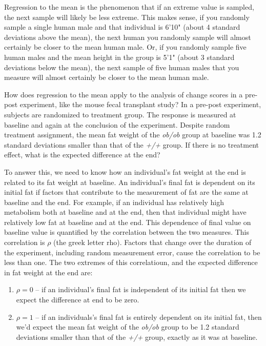 \documentclass[]{book}
\providecommand{\tightlist}{%
  \setlength{\itemsep}{0pt}\setlength{\parskip}{0pt}}
\begin{document}
Regression to the mean is the phenomenon that if an extreme value is
sampled, the next sample will likely be less extreme. This makes sense,
if you randomly sample a single human male and that individual is 6'10"
(about 4 standard deviations above the mean), the next human you
randomly sample will almost certainly be closer to the mean human male.
Or, if you randomly sample five human males and the mean height in the
group is 5'1" (about 3 standard deviations below the mean), the next
sample of five human males that you measure will almost certainly be
closer to the mean human male.

How does regression to the mean apply to the analysis of change scores
in a pre-post experiment, like the mouse fecal transplant study? In a
pre-post experiment, subjects are randomized to treatment group. The
response is measured at baseline and again at the conclusion of the
experiment. Despite random treatment assignment, the mean fat weight of
the \emph{ob/ob} group at baseline was 1.2 standard deviations smaller
than that of the \emph{+/+} group. If there is no treatment effect, what
is the expected difference at the end?

To answer this, we need to know how an individual's fat weight at the
end is related to its fat weight at baseline. An individual's final fat
is dependent on its initial fat if factors that contribute to the
measurement of fat are the same at baseline and the end. For example, if
an individual has relatively high metabolism both at baseline and at the
end, then that individual might have relatively low fat at baseline and
at the end. This dependence of final value on baseline value is
quantified by the correlation between the two measures. This correlation
is \(\rho\) (the greek letter rho). Factors that change over the
duration of the experiment, including random measurement error, cause
the correlation to be less than one. The two extremes of this
correlatioun, and the expected difference in fat weight at the end are:

\begin{enumerate}
\def\labelenumi{\arabic{enumi}.}
\tightlist
\item
  \(\rho=0\) -- if an individual's final fat is independent of its
  initial fat then we expect the difference at end to be zero.
\item
  \(\rho=1\) -- if an individuals's final fat is entirely dependent on
  its initial fat, then we'd expect the mean fat weight of the
  \emph{ob/ob} group to be 1.2 standard deviations smaller than that of
  the \emph{+/+} group, exactly as it was at baseline.
\end{enumerate}
\end{document}
